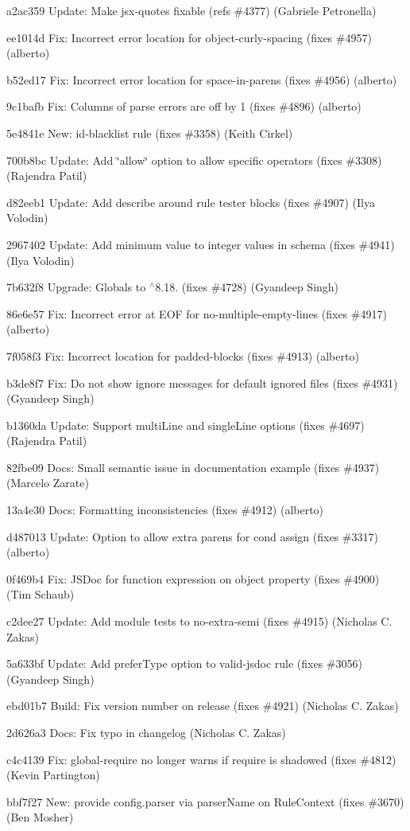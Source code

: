 \begin{DoxyItemize}
\item a2ac359 Update\+: Make jsx-\/quotes fixable (refs \#4377) (Gabriele Petronella)
\item ee1014d Fix\+: Incorrect error location for object-\/curly-\/spacing (fixes \#4957) (alberto)
\item b52ed17 Fix\+: Incorrect error location for space-\/in-\/parens (fixes \#4956) (alberto)
\item 9c1bafb Fix\+: Columns of parse errors are off by 1 (fixes \#4896) (alberto)
\item 5e4841e New\+: \textquotesingle{}id-\/blacklist\textquotesingle{} rule (fixes \#3358) (Keith Cirkel)
\item 700b8bc Update\+: Add \char`\"{}allow\char`\"{} option to allow specific operators (fixes \#3308) (Rajendra Patil)
\item d82eeb1 Update\+: Add describe around rule tester blocks (fixes \#4907) (Ilya Volodin)
\item 2967402 Update\+: Add minimum value to integer values in schema (fixes \#4941) (Ilya Volodin)
\item 7b632f8 Upgrade\+: Globals to $^\wedge$8.18. (fixes \#4728) (Gyandeep Singh)
\item 86e6e57 Fix\+: Incorrect error at E\+OF for no-\/multiple-\/empty-\/lines (fixes \#4917) (alberto)
\item 7f058f3 Fix\+: Incorrect location for padded-\/blocks (fixes \#4913) (alberto)
\item b3de8f7 Fix\+: Do not show ignore messages for default ignored files (fixes \#4931) (Gyandeep Singh)
\item b1360da Update\+: Support multi\+Line and single\+Line options (fixes \#4697) (Rajendra Patil)
\item 82fbe09 Docs\+: Small semantic issue in documentation example (fixes \#4937) (Marcelo Zarate)
\item 13a4e30 Docs\+: Formatting inconsistencies (fixes \#4912) (alberto)
\item d487013 Update\+: Option to allow extra parens for cond assign (fixes \#3317) (alberto)
\item 0f469b4 Fix\+: J\+S\+Doc for function expression on object property (fixes \#4900) (Tim Schaub)
\item c2dee27 Update\+: Add module tests to no-\/extra-\/semi (fixes \#4915) (Nicholas C. Zakas)
\item 5a633bf Update\+: Add {\ttfamily prefer\+Type} option to {\ttfamily valid-\/jsdoc} rule (fixes \#3056) (Gyandeep Singh)
\item ebd01b7 Build\+: Fix version number on release (fixes \#4921) (Nicholas C. Zakas)
\item 2d626a3 Docs\+: Fix typo in changelog (Nicholas C. Zakas)
\item c4c4139 Fix\+: global-\/require no longer warns if require is shadowed (fixes \#4812) (Kevin Partington)
\item bbf7f27 New\+: provide config.\+parser via {\ttfamily parser\+Name} on Rule\+Context (fixes \#3670) (Ben Mosher)
\end{DoxyItemize}

